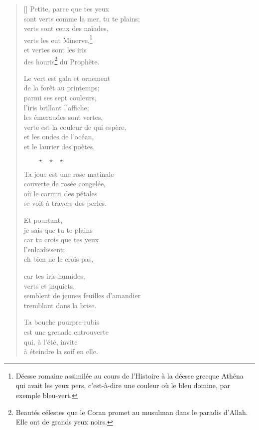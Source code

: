 \documentclass[a4paper,12pt]{book}
\begin{document}
\begin{verse}[\versewidth]
  Petite, parce que tes yeux \\
  sont verts comme la mer, tu te plains; \\
  verts sont ceux des naïades, \\
  verts les eut Minerve,\footnote{Déesse romaine assimilée au cours de
  l'Histoire à la déesse grecque Athéna qui avait les yeux pers,
  c'est-à-dire une couleur où le bleu domine, par exemple bleu-vert.} \\
  et vertes sont les iris \\
  des houris\footnote{Beautés célestes que le Coran promet au musulman
  dans le paradis d'Allah. Elle ont de grands yeux noirs.} du
  Prophète.

  Le vert est gala et ornement \\
  de la forêt au printemps; \\
  parmi ses sept couleurs, \\
  l'iris brillant l'affiche; \\
  les émeraudes sont vertes, \\
  verte est la couleur de qui espère, \\
  et les ondes de l'océan, \\
  et le laurier des poètes.

  $\ \ \ \ \ \ \ \ \ \star \ \ \ \star \ \ \ \star$

  Ta joue est une rose matinale \\
  couverte de rosée congelée, \\
  où le carmin des pétales \\
  se voit à travers des perles.

  Et pourtant, \\
  je sais que tu te plains \\
  car tu crois que tes yeux \\
  l'enlaidissent: \\
  eh bien ne le crois pas,

  car tes iris humides, \\
  verts et inquiets, \\
  semblent de jeunes feuilles d'amandier \\
  tremblant dans la brise.

  Ta bouche pourpre-rubis \\
  est une grenade entrouverte \\
  qui, à l'été, invite \\
  à éteindre la soif en elle.


\end{verse}
\end{document}
